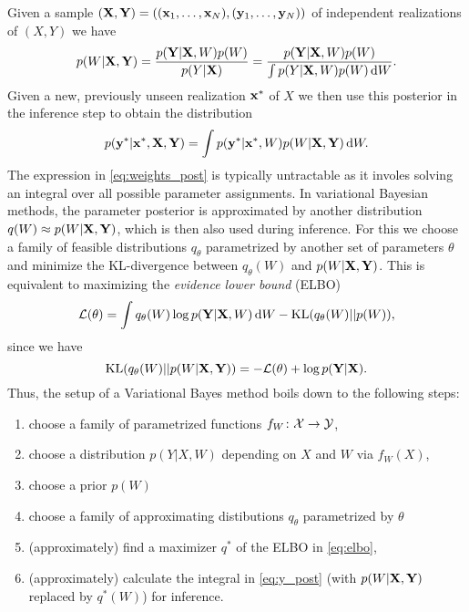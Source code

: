 \documentclass[10pt, a4paper]{article}
\begin{document}
Given a sample $(\mathbf{X}, \mathbf{Y})=((\mathbf{x}_1,\dots,\mathbf{x}_N),(\mathbf{y}_1,\dots,\mathbf{y}_N))$ of independent realizations of $(X, Y)$
we have
\begin{equation}\label{eq:weights_post}
    p(W\vert\mathbf{X},\mathbf{Y}) = \frac{p(\mathbf{Y}\vert\mathbf{X},W) p(W)}{p(Y\vert\mathbf{X})} = \frac{p(\mathbf{Y}\vert\mathbf{X},W) p(W)}{\int p(Y\vert\mathbf{X}, W) p(W)\,\mathrm{d} W}.
\end{equation}
Given a new, previously unseen realization $\mathbf{x}^\ast$ of $X$ we then use this
posterior in the inference step to obtain the distribution
\begin{equation}\label{eq:y_post}
    p(\mathbf{y}^\ast\vert\mathbf{x}^\ast,\mathbf{X},\mathbf{Y}) = \int p(\mathbf{y}^\ast\vert\mathbf{x}^\ast, W) p(W\vert\mathbf{X},\mathbf{Y})\,\mathrm{d} W.
\end{equation}
The expression in \cref{eq:weights_post} is typically untractable as it involes
solving an integral over all possible parameter assignments. In variational
Bayesian methods, the parameter posterior is approximated by another distribution
$q(W)\approx p(W\vert\mathbf{X},\mathbf{Y})$, which is then also used during inference.
For this we choose a family of feasible distributions
$q_\theta$ parametrized by another set of parameters $\theta$ and minimize the KL-divergence
between $q_\theta(W)$ and $p(W\vert\mathbf{X},\mathbf{Y})$. This is equivalent to maximizing the \emph{evidence lower bound} (ELBO)
\begin{equation}\label{eq:elbo}
  \mathcal{L}(\theta) = \int q_\theta(W) \log p(\mathbf{Y}\vert \mathbf{X}, W)\,\mathrm{d} W - \operatorname*{KL}(q_\theta(W)\vert\vert p(W)),
\end{equation}
since we have
\[\operatorname*{KL}(q_\theta(W)\vert\vert p(W\vert\mathbf{X},\mathbf{Y})) = - \mathcal{L}(\theta) + \log p(\mathbf{Y}\vert\mathbf{X}).\]
Thus, the setup of a Variational Bayes method boils down to the following steps:
\begin{enumerate}
  \item choose a family of parametrized functions $f_W\colon\mathcal{X}\to\mathcal{Y}$,
  \item choose a distribution $p(Y\vert X,W)$ depending on $X$ and $W$ via $f_W(X)$,
  \item choose a prior $p(W)$
  \item choose a family of approximating distibutions $q_\theta$ parametrized by $\theta$
  \item (approximately) find a maximizer $q^\ast$ of the ELBO in \cref{eq:elbo},
  \item (approximately) calculate the integral in \cref{eq:y_post} (with $p(W\vert\mathbf{X},\mathbf{Y})$ replaced by $q^\ast(W)$) for inference.
\end{enumerate}
\end{document}
